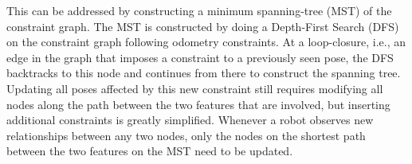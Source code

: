 This can be addressed by constructing a  minimum spanning-tree  (MST) of the constraint graph. The MST is constructed by doing a Depth-First Search (DFS) on the constraint graph following odometry constraints. At a loop-closure, i.e., an edge in the graph that imposes a constraint to a previously seen pose, the DFS backtracks to this node and continues from there to construct the spanning tree. Updating all poses affected by this new constraint still requires modifying all nodes along the path between the two features that are involved, but inserting additional constraints is greatly simplified. Whenever a robot observes new relationships between any two nodes, only the nodes on the shortest path between  the two features on the MST need to be updated. %

